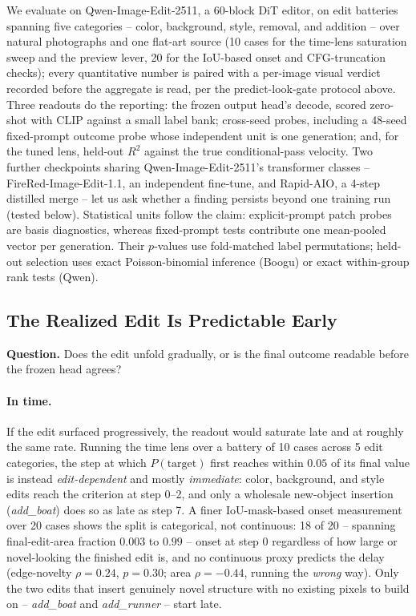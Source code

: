 \documentclass[letterpaper]{article} %
\newcommand{\model}{Qwen-Image-Edit-2511}
\begin{document}
We evaluate on \model{}, a 60-block DiT editor, on edit batteries
spanning five categories -- color, background, style, removal, and
addition -- over natural photographs and one flat-art source (10 cases
for the time-lens saturation sweep and the preview lever, 20 for the
IoU-based onset and CFG-truncation checks); every quantitative number
is paired with a per-image visual verdict recorded before the
aggregate is read, per the predict-look-gate protocol above. Three
readouts do the reporting: the frozen output head's decode, scored
zero-shot with CLIP against a small label bank; cross-seed probes,
including a 48-seed fixed-prompt outcome probe whose independent unit
is one generation; and, for the tuned lens, held-out $R^2$ against the true
conditional-pass velocity. Two further checkpoints sharing \model{}'s
transformer classes -- FireRed-Image-Edit-1.1, an independent
fine-tune, and Rapid-AIO, a 4-step distilled merge -- let us ask
whether a finding persists beyond one training run
(tested below).
Statistical units follow the claim: explicit-prompt patch probes are basis
diagnostics, whereas fixed-prompt tests contribute one mean-pooled vector per
generation. Their $p$-values use fold-matched label permutations; held-out
selection uses exact Poisson-binomial inference (Boogu) or exact within-group
rank tests (Qwen).

\subsection{The Realized Edit Is Predictable Early}\label{sec:early}

\noindent\textbf{Question.} Does the edit unfold gradually, or is the
final outcome readable before the frozen head agrees?

\paragraph{In time.} If the edit surfaced progressively, the readout would
saturate late and at roughly the same rate. Running the time lens over a battery of
10 cases across 5 edit categories, the step at which $P(\text{target})$
first reaches within $0.05$ of its final value is instead
\emph{edit-dependent} and mostly \emph{immediate}: color, background, and
style edits reach the criterion at step 0--2, and only a wholesale
new-object insertion (\emph{add\_boat}) does so as late as step 7. A finer
IoU-mask-based onset measurement over 20 cases shows the split is
categorical, not continuous: 18 of 20 -- spanning final-edit-area
fraction $0.003$ to $0.99$ -- onset at step 0 regardless of how large or
novel-looking the finished edit is, and no continuous proxy predicts the
delay (edge-novelty $\rho{=}0.24$, $p{=}0.30$; area $\rho{=}{-}0.44$,
running the \emph{wrong} way). Only the two edits that insert genuinely
novel structure with no existing pixels to build on -- \emph{add\_boat}
and \emph{add\_runner} -- start late.
\end{document}
